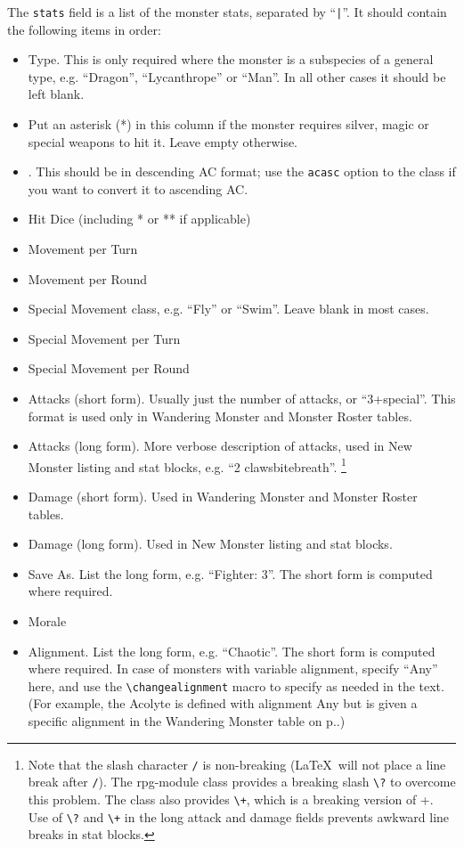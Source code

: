\documentclass[letterpaper,serif]{rpg-module}
\begin{document}
\noindent The \verb|stats| field is a list of the monster stats, separated by ``\verb:|:''. It should contain the following items in order:
\renewcommand{\labelitemi}{$\bullet$}
\begin{itemize}\setlength{\itemsep}{0pt}
\item Type. This is only required where the monster is a subspecies of a general type, e.g. ``Dragon'', ``Lycanthrope'' or ``Man''. In all other cases
it should be left blank.
\item Put an asterisk (*) in this column if the monster requires silver, magic or special weapons to hit it. Leave empty otherwise.
\item \ArmourClass. This should be in descending AC format; use the \verb|acasc| option to the class if you want to convert it to ascending AC.
\item Hit Dice (including * or ** if applicable)
\item Movement per Turn
\item Movement per Round
\item Special Movement class, e.g. ``Fly'' or ``Swim''. Leave blank in most cases.
\item Special Movement per Turn
\item Special Movement per Round
\item Attacks (short form). Usually just the number of attacks, or ``3+special''. This format is used only in Wandering Monster and Monster Roster tables.
\item Attacks (long form). More verbose description of attacks, used in New Monster listing and stat blocks, e.g. ``2 claws\?bite\+breath''.
\footnote{Note that the slash character \texttt{/} is non-breaking (\LaTeX~will not place a line break after \texttt{/}). The rpg-module class provides a breaking
slash \texttt{\textbackslash ?} to overcome this problem. The class also provides \texttt{\textbackslash +}, which is a breaking version of +. Use of
\texttt{\textbackslash ?} and \texttt{\textbackslash +} in the long attack and damage fields prevents awkward line breaks in stat blocks.}
\item Damage (short form). Used in Wandering Monster and Monster Roster tables.
\item Damage (long form). Used in New Monster listing and stat blocks.
\item Save As. List the long form, e.g. ``Fighter: 3''. The short form is computed where required.
\item Morale
\item Alignment. List the long form, e.g. ``Chaotic''. The short form is computed where required. In case of monsters with variable alignment, specify ``Any''
here, and use the \verb|\changealignment| macro to specify as needed in the text. (For example, the Acolyte is defined with alignment Any but is given a specific
alignment in the Wandering Monster table on p.\pageref{wanderingmonsters}.)


\end{itemize}
\end{document}
